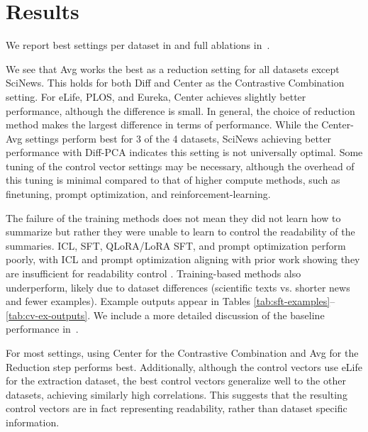 \clearpage

\section{Results}\label{sec:4-chapter-results}
We report best settings per dataset in  and full ablations in~. 

We see that Avg works the best as a reduction setting for all datasets except SciNews. This holds for both Diff and Center as the Contrastive Combination setting. For eLife, PLOS, and Eureka, Center achieves slightly better performance, although the difference is small. In general, the choice of reduction method makes the largest difference in terms of performance. While the Center-Avg settings perform best for 3 of the 4 datasets, SciNews achieving better performance with Diff-PCA indicates this setting is not universally optimal. Some tuning of the control vector settings may be necessary, although the overhead of this tuning is minimal compared to that of higher compute methods, such as finetuning, prompt optimization, and reinforcement-learning.

The failure of the training methods does not mean they did not learn how to summarize but rather they were unable to learn to control the readability of the summaries.  ICL, SFT, QLoRA/LoRA SFT, and prompt optimization perform poorly, with ICL and prompt optimization aligning with prior work showing they are insufficient for readability control \cite{ribeiro-etal-2023-generating}. Training-based methods also underperform, likely due to dataset differences (scientific texts vs. shorter news and fewer examples). Example outputs appear in Tables \ref{tab:sft-examples}–\ref{tab:cv-ex-outputs}. We include a more detailed discussion of the baseline performance in~.


For most settings, using Center for the Contrastive Combination and Avg for the Reduction step performs best. Additionally, although the control vectors use eLife for the extraction dataset, the best control vectors generalize well to the other datasets, achieving similarly high correlations. This suggests that the resulting control vectors are in fact representing readability, rather than dataset specific information. 


